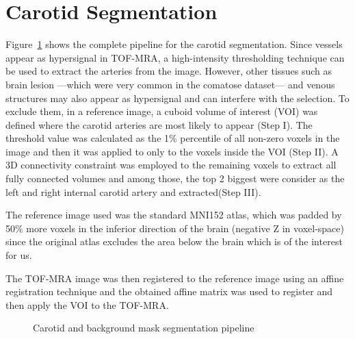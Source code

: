 \section{Carotid Segmentation\label{sec:carotid}}
Figure~\ref{fig:seg_pipeline} shows the complete pipeline for the carotid segmentation.
Since vessels appear as hypersignal in TOF-MRA, a high-intensity thresholding technique can be used to extract the arteries from the image.
However, other tissues such as  brain lesion ---which were very common in the comatose dataset--- and venous structures may also appear as hypersignal and can interfere with the selection.
To exclude them, in a reference image, a cuboid volume of interest (VOI) was defined where the carotid arteries are most likely to appear (Step I).
The threshold value was calculated as the 1\% percentile of all non-zero voxels in the image and then it was applied to only to the voxels inside the VOI (Step II).
A 3D connectivity constraint was employed to the remaining voxels to extract all fully connected volumes and among those, the top 2 biggest were consider as the left and right internal carotid artery and extracted(Step III).

The reference image used was the standard MNI152 atlas, which was padded by 50\% more voxels in the inferior direction of the brain (negative Z in voxel-space) since the original atlas excludes the area below the brain which is of the interest for us.

The TOF-MRA image was then registered to the reference image using an affine registration technique and the obtained affine matrix was used to register and then apply the VOI to the TOF-MRA.

\begin{figure}[h]
	\centering
	\caption{Carotid and background mask segmentation pipeline}
	\label{fig:seg_pipeline}
\end{figure}

